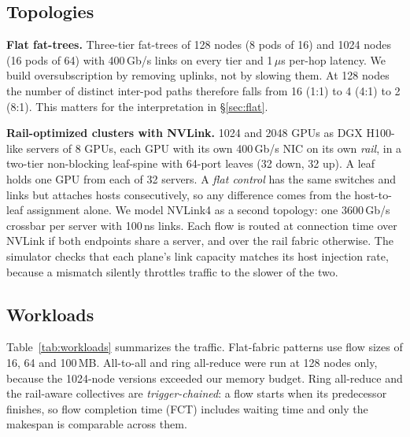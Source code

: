 \documentclass[conference]{IEEEtran}
\begin{document}
\subsection{Topologies}
\textbf{Flat fat-trees.}
Three-tier fat-trees of 128 nodes (8 pods of 16) and 1024 nodes (16 pods of
64) with 400\,Gb/s links on every tier and 1\,$\mu$s per-hop latency. We build
oversubscription by removing uplinks, not by slowing them. At 128 nodes the
number of distinct inter-pod paths therefore falls from 16 (1:1) to 4 (4:1) to 2
(8:1). This matters for the interpretation in \S\ref{sec:flat}.

\textbf{Rail-optimized clusters with NVLink.}
1024 and 2048 GPUs as DGX H100-like servers of 8 GPUs, each GPU with its own
400\,Gb/s NIC on its own \emph{rail}, in a two-tier non-blocking leaf-spine with
64-port leaves (32 down, 32 up). A leaf holds one GPU from each of 32 servers. A
\emph{flat control} has the same switches and links but attaches hosts
consecutively, so any difference comes from the host-to-leaf assignment alone. We
model NVLink4 as a second topology: one 3600\,Gb/s crossbar per server with
100\,ns links. Each flow is routed at connection time over NVLink if both
endpoints share a server, and over the rail fabric otherwise. The simulator
checks that each plane's link capacity matches its host injection rate, because
a mismatch silently throttles traffic to the slower of the two.

\subsection{Workloads}
Table~\ref{tab:workloads} summarizes the traffic. Flat-fabric patterns use flow
sizes of 16, 64 and 100\,MB. All-to-all and ring all-reduce were run at 128
nodes only, because the 1024-node versions exceeded our memory budget. Ring
all-reduce and the rail-aware collectives are \emph{trigger-chained}: a flow
starts when its predecessor finishes, so flow completion time (FCT) includes
waiting time and only the makespan is comparable across them.
\end{document}
